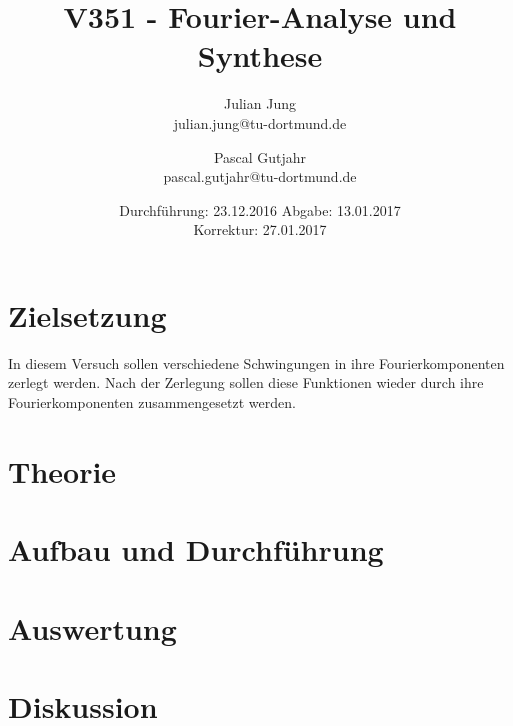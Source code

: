 

\title{V351 - Fourier-Analyse und Synthese}
\author{Julian Jung \\ julian.jung@tu-dortmund.de
  \and Pascal Gutjahr \\ pascal.gutjahr@tu-dortmund.de}
  \date{Durchführung: 23.12.2016
  \hspace{3em}
  Abgabe: 13.01.2017 \\
  Korrektur: 27.01.2017}
  
\maketitle
\newpage
\tableofcontents
\newpage
\section{Zielsetzung}
In diesem Versuch sollen verschiedene Schwingungen in ihre
Fourierkomponenten zerlegt werden. Nach der Zerlegung sollen diese Funktionen
wieder durch ihre Fourierkomponenten zusammengesetzt werden.
\section{Theorie}
 
\section{Aufbau und Durchführung}
 
\section{Auswertung}
 
\section{Diskussion}
 
\printbibliography

